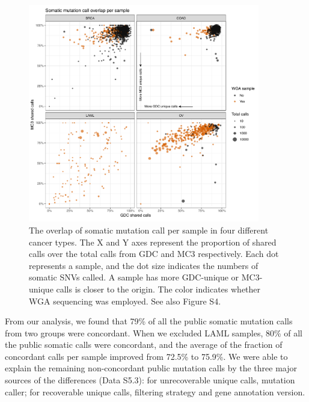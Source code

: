 \begin{figure}[tb]
    \centering
    \includegraphics[width=0.9\textwidth]{figures/chap02_mutation_pipeline_qc/GDC_MC3_overlap_per_sample.pdf}
    \caption[Overlapping somatic mutation calls between GDC and MC3 per sample.]{The overlap of somatic mutation call per sample in four different cancer types. The X and Y axes represent the proportion of shared calls over the total calls from GDC and MC3 respectively. Each dot represents a sample, and the dot size indicates the numbers of somatic SNVs called. A sample has more GDC-unique or MC3-unique calls is closer to the origin. The color indicates whether WGA sequencing was employed. See also Figure S4.}
    \label{fig:mut-call-qc-overlap}
\end{figure}

From our analysis, we found that 79\% of all the public somatic mutation calls from two groups were concordant. When we excluded LAML samples, 80\% of all the public somatic calls were concordant, and the average of the fraction of concordant calls per sample improved from 72.5\% to 75.9\%. We were able to explain the remaining non-concordant public mutation calls by the three major sources of the differences (Data S5.3): for unrecoverable unique calls, mutation caller; for recoverable unique calls, filtering strategy and gene annotation version.



